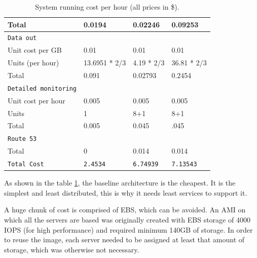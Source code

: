 \documentclass{uvamscse}
\begin{document}
\begin{table}[H]
\begin{center}
\begin{tabular}{llll}
  Total                              & 0.0194              & 0.02246             & 0.09253  \\
  \hline
  \texttt{Data out} \\
  Unit cost per GB                   & 0.01                & 0.01                & 0.01              \\
  Units (per hour)                   & 13.6951 * 2/3       & 4.19 * 2/3          & 36.81 * 2/3        \\
  Total                              & 0.091               & 0.02793             & 0.2454             \\
  \hline
  \texttt{Detailed monitoring} \\
  Unit cost per hour                 & 0.005               & 0.005               & 0.005              \\
  Units                              & 1                   & 8+1                 & 8+1     \\
  Total                              & 0.005               & 0.045               & .045       \\
  \hline
  \texttt{Route 53} \\
  Total                              & 0                   & 0.014               & 0.014              \\
  \hline
  \texttt{Total Cost}                & \texttt{2.4534} & \texttt{6.74939}     & \texttt{7.13543}         \\
\end{tabular}
\end{center}
\caption{System running cost per hour (all prices in \$).}
\label{table:cost}
\end{table}

As shown in the table \ref{table:cost}, the baseline architecture is the cheapest. It is the simplest and least distributed, this is why it needs least services to support it.

A huge chunk of cost is comprised of EBS, which can be avoided. An AMI on which all the servers are based was originally created with EBS storage of 4000 IOPS (for high performance) and required minimum 140GB of storage. In order to reuse the image, each server needed to be assigned at least that amount of storage, which was otherwise not necessary.
\end{document}
